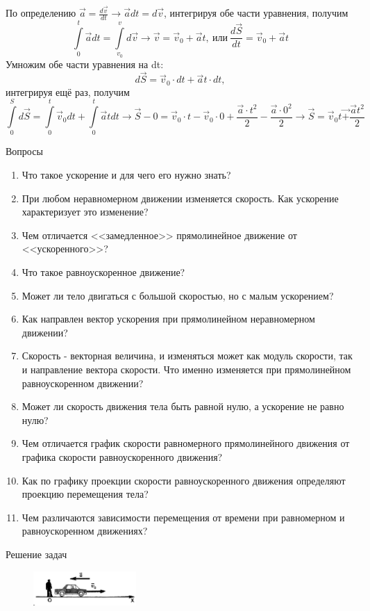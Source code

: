 \documentclass[a5paper, 10pt]{diss_4}
\renewcommand{\'}{\,'}
\begin{document}
По определению $\vec{a}=\frac{d\vec{v}}{dt}\to\vec{a}dt=d\vec{v}$,
интегрируя обе части уравнения, получим
\[\int\limits_{0}^{t}\vec{a}dt=\int\limits_{v_0}^{v}d\vec{v}\to\vec{v}=
\vec{v}_0+\vec{a}t,\ или\ \frac{d\vec{S}}{dt}=\vec{v}_0+\vec{a}t
\]
Умножим обе части уравнения на dt:
\[d\vec{S}=\vec{v}_0\cdot dt+\vec{a}t\cdot dt,\]
интегрируя ещё раз, получим
\[
\int\limits_{0}^{S}d\vec{S}=\int\limits_{0}^{t}\vec{v}_0dt+
\int\limits_{0}^{t}\vec{a}tdt\to\vec{S}-0=
\vec{v}_0\cdot t-\vec{v}_0\cdot 0+\frac{\vec{a}\cdot{t^2}}{2}-
\frac{\vec{a}\cdot{0^2}}{2}\to
\vec{S}=\vec{v}_0t\vec{+}\frac{\vec{a}t^2}{2}
\]

\begin{center}
   Вопросы
\end{center}
\begin{enumerate}
\item Что  такое  ускорение   и   для   чего  его нужно знать?
\item При любом неравномерном движении изменяется   скорость.   Как   ускорение   характеризует это изменение?
\item Чем   отличается   <<замедленное>>   прямолинейное    движение    от    <<ускоренного>>?
\item Что     такое     равноускоренное     движение?
\item Может ли  тело двигаться  с большой скоростью, но с малым ускорением?
\item Как направлен  вектор ускорения  при прямолинейном неравномерном движении?
\item Скорость - векторная величина, и изменяться может как модуль скорости, так и  направление вектора скорости. Что именно изменяется при прямолинейном  равноускоренном движении?
\item Может ли скорость движения  тела быть равной  нулю, а ускорение не равно нулю?
\item Чем отличается график скорости равномерного прямолинейного движения от графика скорости равноускоренного движения?
\item Как   по   графику   проекции   скорости равноускоренного      движения      определяют проекцию перемещения тела?
\item Чем различаются зависимости перемещения от времени при равномерном и равноускоренном движениях?
\end{enumerate}
\begin{center}
   Решение задач
\end{center}
\begin{figure}
\begin{center}
  \includegraphics[width=0.35\textwidth]{img/img15.eps}\\
\end{center}
  \caption{}\label{img1516}
\end{figure}
\end{document}
